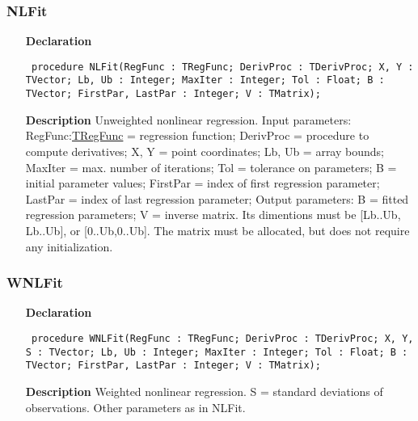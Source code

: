\documentclass[12pt,a4paper,oneside]{report}
\newcommand{\declarationitem}[1]{\textbf{#1}}
\newcommand{\descriptiontitle}[1]{\textbf{#1}}
\newcommand{\code}[1]{\texttt{#1}}
\begin{document}
\subsubsection{NLFit}
\label{unlfit-NLFit}
\begin{itemize}\item[\declarationitem{Declaration}\hfill]
	\begin{flushleft}
		\code{
			procedure NLFit(RegFunc : TRegFunc; DerivProc : TDerivProc; X, Y : TVector; Lb, Ub : Integer; MaxIter : Integer; Tol : Float; B : TVector; FirstPar, LastPar : Integer; V : TMatrix);}
		
	\end{flushleft}
	
	\par
	\item[\descriptiontitle{Description}]
	Unweighted nonlinear regression. Input parameters: RegFunc:\hyperref[utypes-TRegFunc]{TRegFunc} = regression function; DerivProc = procedure to compute derivatives; X, Y = point coordinates; Lb, Ub = array bounds; MaxIter = max. number of iterations; Tol = tolerance on parameters; B = initial parameter values; FirstPar = index of first regression parameter; LastPar = index of last regression parameter; Output parameters: B = fitted regression parameters; V = inverse matrix. Its dimentions must be [Lb..Ub, Lb..Ub], or [0..Ub,0..Ub]. The matrix must be allocated, but does not require any initialization.
	
\end{itemize}
\subsubsection{WNLFit}
\label{unlfit-WNLFit}
\begin{itemize}\item[\declarationitem{Declaration}\hfill]
	\begin{flushleft}
		\code{
			procedure WNLFit(RegFunc : TRegFunc; DerivProc : TDerivProc; X, Y, S : TVector; Lb, Ub : Integer; MaxIter : Integer; Tol : Float; B : TVector; FirstPar, LastPar : Integer; V : TMatrix);}
		
	\end{flushleft}
	
	\par
	\item[\descriptiontitle{Description}]
	Weighted nonlinear regression. S = standard deviations of observations. Other parameters as in NLFit.
	
\end{itemize}
\end{document}
